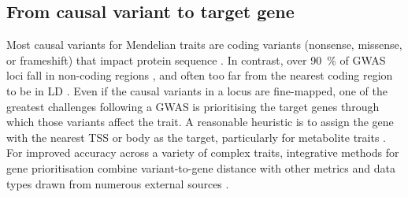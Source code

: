 %
%
%
%

\subsection{From causal variant to target gene}

Most causal variants for Mendelian traits are coding variants (nonsense, missense, or frameshift) that impact protein sequence \autocite{chong2015GeneticBasisMendelian}.
In contrast, over \SI{90}{\percent} of \gls{GWAS} loci fall in non-coding regions \autocite{gallagher2018PostGWASEraAssociation},
and often too far from the nearest coding region to be in \gls{LD} \autocite{brodie2016HowFarSNP}.
Even if the causal variants in a locus are fine-mapped, 
one of the greatest challenges following a \gls{GWAS} is prioritising the target genes through which those variants affect the trait.
%
A reasonable heuristic is to assign the gene with the nearest \gls{TSS} or body as the target, particularly for metabolite traits \autocite{stacey2019ProGeMFrameworkPrioritization}.
For improved accuracy across a variety of complex traits,
integrative methods for gene prioritisation combine variant-to-gene distance with other metrics and data types drawn from numerous external sources \autocite{stacey2019ProGeMFrameworkPrioritization,forgetta2020EffectorIndexPredict,ghoussaini2020OpenTargetsGenetics}.

